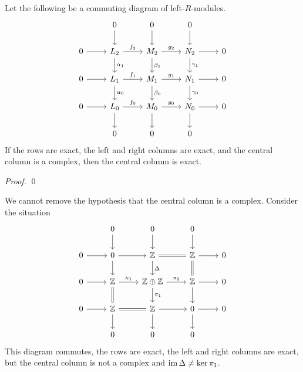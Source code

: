 \begin{prop}
Let the following be a commuting diagram of left-$R$-modules.
\[ \begin{tikzcd}
& 0 \arrow[d] & 0 \arrow[d] & 0 \arrow[d] \\
0 \arrow[r] & L_2 \arrow[r,"f_2"] \arrow[d,"\alpha_1"] & M_2 \arrow[r,"g_2"] \arrow[d,"\beta_1"] & N_2 \arrow[r] \arrow[d,"\gamma_1"] & 0 \\
0 \arrow[r] & L_1 \arrow[r,"f_1"] \arrow[d,"\alpha_0"] & M_1 \arrow[r,"g_1"] \arrow[d,"\beta_0"] & N_1 \arrow[r] \arrow[d,"\gamma_0"] & 0 \\
0 \arrow[r] & L_0 \arrow[r,"f_0"] \arrow[d] & M_0 \arrow[r,"g_0"] \arrow[d] & N_0 \arrow[r] \arrow[d] & 0 \\
& 0 & 0 & 0
\end{tikzcd} \]
If the rows are exact, the left and right columns are exact, and the central column is a complex, then the central column is exact.
\end{prop}

\begin{proof}
\pf
{}
\qed
\end{proof}

\begin{ex}
We cannot remove the hypothesis that the central column is a complex. Consider the situation
\[ \begin{tikzcd}
& 0 \arrow[d] & 0 \arrow[d] & 0 \arrow[d] \\
0 \arrow[r] & 0 \arrow[r] \arrow[d] & \mathbb{Z} \arrow[r,equals] \arrow[d,"\Delta"] & \mathbb{Z} \arrow[r] \arrow[d,equals] & 0 \\
0 \arrow[r] & \mathbb{Z} \arrow[r,"\kappa_1"] \arrow[d,equals] & \mathbb{Z} \oplus \mathbb{Z} \arrow[r,"\pi_2"] \arrow[d, "\pi_1"] & \mathbb{Z} \arrow[r] \arrow[d] & 0 \\
0 \arrow[r] & \mathbb{Z} \arrow[r,equals] \arrow[d] & \mathbb{Z} \arrow[r] \arrow[d] & 0 \arrow[r] \arrow[d] & 0 \\
& 0 & 0 & 0
\end{tikzcd} \]
This diagram commutes, the rows are exact, the left and right columns are exact, but the central column is not a complex and $\operatorname{im} \Delta \neq \ker \pi_1$.
\end{ex}


